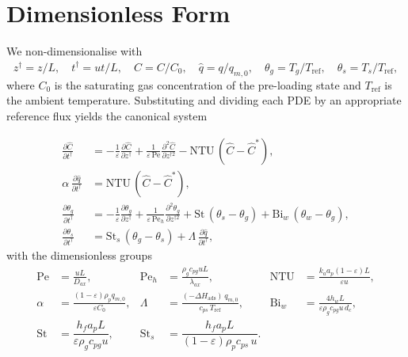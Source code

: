 \documentclass[a4paper,11pt]{amsart}
\theoremstyle{definition}
\begin{document}
\section{Dimensionless Form}\label{sec:nondim}

We non-dimensionalise with
\[
z^\dagger=z/L,\quad t^\dagger=u t/L,\quad \hat C=C/C_0,\quad \hat q=q/q_{m,0},\quad
\theta_g=T_g/T_{\text{ref}},\quad \theta_s=T_s/T_{\text{ref}},
\]
where $C_0$ is the saturating gas concentration of the pre-loading state and $T_{\text{ref}}$ is the ambient temperature. Substituting and dividing each PDE by an appropriate reference flux yields the canonical system

\begin{align}
\frac{\partial\hat C}{\partial t^\dagger}
&=-\frac{1}{\varepsilon}\frac{\partial\hat C}{\partial z^\dagger}
+\frac{1}{\varepsilon\,\mathrm{Pe}}\frac{\partial^2\hat C}{\partial z^{\dagger 2}}
-\mathrm{NTU}\,(\hat C-\hat C^\ast),
\label{eq:nd-gas-mass}\\[2pt]
\alpha\,\frac{\partial \hat q}{\partial t^\dagger}
&=\mathrm{NTU}\,(\hat C-\hat C^\ast),
\label{eq:nd-solid-mass}\\[2pt]
\frac{\partial\theta_g}{\partial t^\dagger}
&=-\frac{1}{\varepsilon}\frac{\partial\theta_g}{\partial z^\dagger}
+\frac{1}{\varepsilon\,\mathrm{Pe}_h}\frac{\partial^2\theta_g}{\partial z^{\dagger 2}}
+\mathrm{St}\,(\theta_s-\theta_g)
+\mathrm{Bi}_w\,(\theta_w-\theta_g),
\label{eq:nd-gas-energy}\\[2pt]
\frac{\partial\theta_s}{\partial t^\dagger}
&=\mathrm{St}_s\,(\theta_g-\theta_s)+\Lambda\,\frac{\partial \hat q}{\partial t^\dagger},
\label{eq:nd-solid-energy}
\end{align}
with the dimensionless groups
\begin{equation}\label{eq:groups}
\begin{aligned}
\mathrm{Pe}&=\frac{uL}{D_{ax}}, &
\mathrm{Pe}_h&=\frac{\rho_g c_{pg} u L}{\lambda_{ax}}, &
\mathrm{NTU}&=\frac{k_a a_p(1-\varepsilon)L}{\varepsilon u},\\
\alpha&=\frac{(1-\varepsilon)\rho_p q_{m,0}}{\varepsilon C_0}, &
\Lambda&=\frac{(-\Delta H_{\text{ads}})\,q_{m,0}}{c_{ps}\,T_{\text{ref}}}, &
\mathrm{Bi}_w&=\frac{4 h_w L}{\varepsilon\rho_g c_{pg} u\,d_c},\\
\mathrm{St}&=\dfrac{h_f a_p L}{\varepsilon\rho_g c_{pg}u}, &
\mathrm{St}_s&=\dfrac{h_f a_p L}{(1-\varepsilon)\rho_p c_{ps}\,u}.
\end{aligned}
\end{equation}
\end{document}
